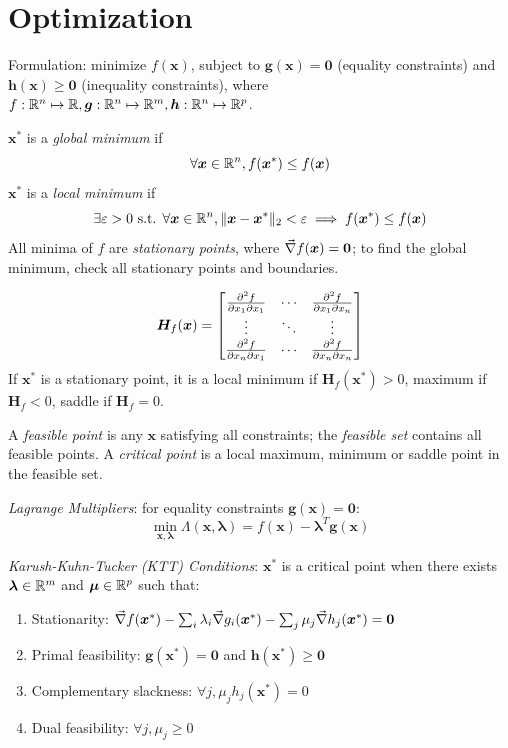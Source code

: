 \documentclass[twocolumn]{article}
\begin{document}
\section{Optimization}

Formulation: minimize $f(\bm x)$, subject to $\bm g(\bm x) = \bm 0$ (equality constraints) and $\bm h(\bm x) \geq \bm 0$ (inequality constraints), where $f: \mathbb{R}^n \mapsto \mathbb{R}, \bm g: \mathbb{R}^n \mapsto \mathbb{R}^m, \bm h: \mathbb{R}^n \mapsto \mathbb{R}^p$.

$\bm x^*$ is a \textit{global minimum} if $$\forall \bm x \in \mathbb{R}^n, f(\bm x^*) \leq f(\bm x)$$
$\bm x^*$ is a \textit{local minimum} if $$\exists \varepsilon > 0\text{ s.t. } \forall \bm x \in \mathbb{R}^n, \lVert\bm x - \bm x^*\rVert_2 < \varepsilon \implies f(\bm x^*) \leq f(\bm x)$$
All minima of $f$ are \textit{stationary points}, where $\vec\nabla f(\bm x) = \bm 0$; to find the global minimum, check all stationary points and boundaries.

$$\bm H_f(\bm x) = \begin{bmatrix} {\frac{\partial^2 f}{\partial x_1 \partial x_1}} & {\cdots} & {\frac{\partial^2 f}{\partial x_1 \partial x_n}} \\ {\vdots} & {\ddots} & {\vdots} \\ {\frac{\partial^2 f}{\partial x_n \partial x_1}} & {\cdots} & {\frac{\partial^2 f}{\partial x_n \partial x_n}} \end{bmatrix}$$
If $\bm x^*$ is a stationary point, it is a local minimum if $\bm H_f(\bm x^*) > 0$, maximum if $\bm H_f < 0$, saddle if $\bm H_f = 0$.

A \textit{feasible point} is any $\bm x$ satisfying all constraints; the \textit{feasible set} contains all feasible points.
A \textit{critical point} is a local maximum, minimum or saddle point in the feasible set.

\textit{Lagrange Multipliers}: for equality constraints $\bm g(\bm x) = \bm 0$:
$$\min _{\bm x, \bm\lambda}\Lambda(\bm x, \bm\lambda) = f(\bm x) - \bm\lambda^T\bm g(\bm x)$$

\textit{Karush-Kuhn-Tucker (KTT) Conditions}: $\bm x^*$ is a critical point when there exists $\bm\lambda \in \mathbb{R}^m$ and $\bm\mu \in \mathbb{R}^p$ such that:
\begin{enumerate}
    \itemsep 0pt
	\item Stationarity: $\vec\nabla f(\bm x^*) - \sum _i \lambda _i\vec\nabla g_i(\bm x^*) - \sum _j \mu _j\vec\nabla h_j(\bm x^*) = \bm 0$
	\item Primal feasibility: $\bm g(\bm x^*) = \bm 0$ and $\bm h(\bm x^*) \geq \bm 0$
	\item Complementary slackness: $\forall j, \mu _jh_j(\bm x^*) = 0$
	\item Dual feasibility: $\forall j, \mu _j \geq 0$
\end{enumerate}
\end{document}

